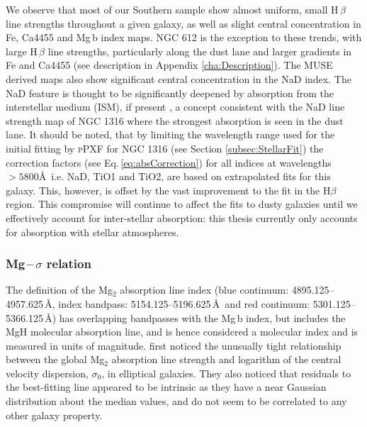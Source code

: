 			We observe that most of our Southern sample show almost uniform, small H\,$\beta$ line strengths throughout a given galaxy, as well as slight central concentration in Fe, Ca4455 and Mg\,b index maps. NGC 612 is the exception to these trends, with large H\,$\beta$ line strengths, particularly along the dust lane and larger gradients in Fe and Ca4455 (see description in Appendix \ref{cha:Description}). The MUSE derived maps also show significant central concentration in the NaD index. The NaD feature is thought to be significantly deepened by absorption from the interstellar medium (ISM), if present \citep[e.g.][]{Phillips1993, Bergmann2009}, a concept consistent with the NaD line strength map of NGC 1316 where the strongest absorption is seen in the dust lane. %
			It should be noted, that by limiting the wavelength range used for the initial fitting by \textsc{pPXF} for NGC 1316 (see Section \ref{subsec:StellarFit}) the correction factors (see Eq.\,\ref{eq:absCorrection}) for all indices at wavelengths $> 5800$\AA\ i.e. NaD, TiO1 and TiO2, are based on extrapolated fits for this galaxy. This, however, is offset by the vast improvement to the fit in the H$\beta$ region. This compromise will continue to affect the fits to dusty galaxies until we effectively account for inter-stellar absorption: this thesis currently only accounts for absorption with stellar atmospheres. 




		\subsubsection{Mg\,--\,$\sigma$ relation}
			\label{subsubssec:Mgsigma}
			The definition of the Mg$_2$ absorption line index (blue continuum: 4895.125--4957.625\,\AA, index bandpass: 5154.125--5196.625\,\AA\ and red continuum: 5301.125--5366.125\,\AA) has overlapping bandpasses with the Mg\,b index, but includes the MgH molecular absorption line, and is hence considered a molecular index and is measured in units of magnitude. \citet{Bender1993} first noticed the unusually tight relationship between the global Mg$_2$ absorption line strength and logarithm of the central velocity dispersion, $\sigma_0$, in elliptical galaxies. They also noticed that residuals to the best-fitting line appeared to be intrinsic as they have a near Gaussian distribution about the median values, and do not seem to be correlated to any other galaxy property. 

